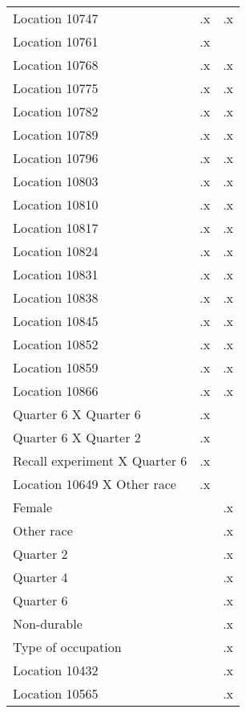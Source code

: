 \begin{tabular}{l*{2}{c}}
Location 10747      &          .x&          .x\\
Location 10761      &          .x&            \\
Location 10768      &          .x&          .x\\
Location 10775      &          .x&          .x\\
Location 10782      &          .x&          .x\\
Location 10789      &          .x&          .x\\
Location 10796      &          .x&          .x\\
Location 10803      &          .x&          .x\\
Location 10810      &          .x&          .x\\
Location 10817      &          .x&          .x\\
Location 10824      &          .x&          .x\\
Location 10831      &          .x&          .x\\
Location 10838      &          .x&          .x\\
Location 10845      &          .x&          .x\\
Location 10852      &          .x&          .x\\
Location 10859      &          .x&          .x\\
Location 10866      &          .x&          .x\\
Quarter 6 X Quarter 6&          .x&            \\
Quarter 6 X Quarter 2&          .x&            \\
Recall experiment X Quarter 6&          .x&            \\
Location 10649 X Other race&          .x&            \\
Female              &            &          .x\\
Other race          &            &          .x\\
Quarter 2           &            &          .x\\
Quarter 4           &            &          .x\\
Quarter 6           &            &          .x\\
Non-durable         &            &          .x\\
Type of occupation  &            &          .x\\
Location 10432      &            &          .x\\
Location 10565      &            &          .x\\

\end{tabular}

